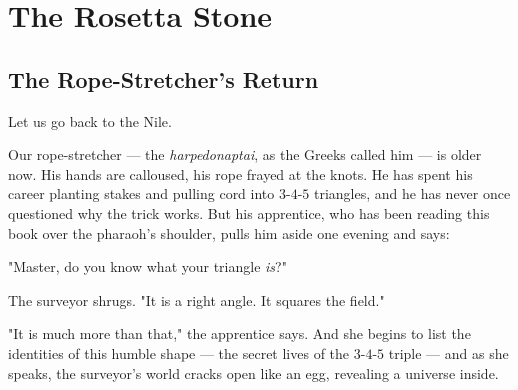 \chapter*{The Rosetta Stone}



\bigskip

\section*{The Rope-Stretcher's Return}

Let us go back to the Nile.

Our rope-stretcher --- the \textit{harpedonaptai}, as the Greeks called him --- is older now. His hands are calloused, his rope frayed at the knots. He has spent his career planting stakes and pulling cord into $3$-$4$-$5$ triangles, and he has never once questioned why the trick works. But his apprentice, who has been reading this book over the pharaoh's shoulder, pulls him aside one evening and says:

"Master, do you know what your triangle \textit{is}?"

The surveyor shrugs. "It is a right angle. It squares the field."

"It is much more than that," the apprentice says. And she begins to list the identities of this humble shape --- the secret lives of the $3$-$4$-$5$ triple --- and as she speaks, the surveyor's world cracks open like an egg, revealing a universe inside.


